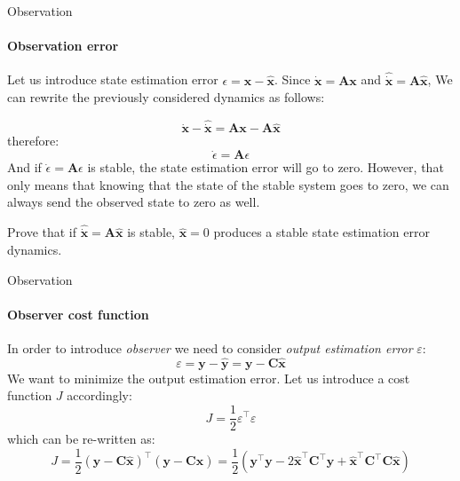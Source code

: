 \documentclass{beamer}
\begin{document}
\begin{frame}{Observation}
\framesubtitle{Observation error}
\begin{flushleft}

Let us introduce state estimation error $\epsilon = \mathbf x -  \hat{\mathbf x}$. Since $\dot {\mathbf x} = \mathbf A \mathbf x$ and $\hat{\dot {\mathbf x}} = \mathbf A \hat{\mathbf x}$, We can rewrite the previously considered dynamics as follows:

\[
\dot {\mathbf x} - \hat{\dot {\mathbf x}} = \mathbf A \mathbf x - \mathbf A \hat{\mathbf x}
\]
therefore:
\[
\dot {\epsilon} = \mathbf A \epsilon
\]
And if $\dot {\epsilon} = \mathbf A \epsilon$ is stable, the state estimation error will go to zero. However, that only means that knowing that the state of the stable system goes to zero, we can always send the observed state to zero as well.

Prove that if $\hat{\dot {\mathbf x}} = \mathbf A \hat{\mathbf x}$ is stable, $\hat{\mathbf x} = 0$ produces a stable state estimation error dynamics.

\end{flushleft}
\end{frame}


\begin{frame}{Observation}
\framesubtitle{Observer cost function}
\begin{flushleft}

In order to introduce \emph{observer} we need to consider \emph{output estimation error} $\varepsilon$:
%
\[
\varepsilon = \mathbf y - \hat{\mathbf y} = \mathbf y - \mathbf C \hat{\mathbf x}
\]
%
We want to minimize the output estimation error. Let us introduce a cost function $J$ accordingly:
%
\[
J = \frac{1}{2} \varepsilon^\top \varepsilon
\]
%
which can be re-written as:
%
\[
J = \frac{1}{2} (\mathbf y - \mathbf C \hat{\mathbf x})^\top (\mathbf y - \mathbf C \hat{\mathbf x}) = 
\frac{1}{2} (\mathbf y^\top \mathbf y - 
2 \hat{\mathbf x}^\top \mathbf C^\top \mathbf y + 
\hat{\mathbf x}^\top \mathbf C^\top \mathbf C \hat{\mathbf x})
\]


\end{flushleft}
\end{frame}
\end{document}
